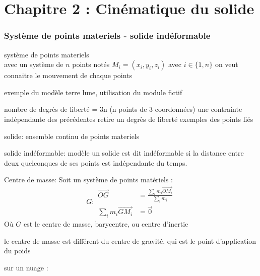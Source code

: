 \documentclass[../main.tex]{subfile}
\begin{document}
\part{Chapitre 2 : Cinématique du solide}

\section{Système de points materiels - solide indéformable}
\begin{defi}
	système de points materiels\\
	avec un système de $n$ points notés $M_i = (x_i, y_i, z_i)$ avec $i \in \{1, n\}$
	on veut connaitre le mouvement de chaque points
\end{defi}

\begin{ex}
	exemple du modèle terre lune, utilisation du module fictif
\end{ex}

	nombre de degrès de liberté = 3n (n points de 3 coordonnées)
	une contrainte indépendante des précédentes retire un degrès de liberté
	exemples des points liés

\begin{defi}
	solide:
	ensemble continu de points materiels
\end{defi}

\begin{defi}
	solide indéformable:
	modèle 
	un solide est dit indéformable si la distance entre deux quelconques de ses points est indépendante du temps.
\end{defi}

\begin{defi}
	Centre de masse:
	Soit un système de points matériels :
	$$
	G :
\begin{aligned}
	\vec{OG} &= \frac{\sum\limits_i m_i \vec{OM_i}}{\sum\limits_i m_i}\\
	\sum\limits_i m_i \vec{GM_i} &= \vec{0}
\end{aligned}
	$$
	Où $G$ est le centre de masse, barycentre, ou centre d'inertie
\end{defi}

\begin{rema}
	le centre de masse est différent du centre de gravité, qui est le point d'application du poids
\end{rema}

\begin{ex}
	sur un nuage : %
\end{ex}
\end{document}
